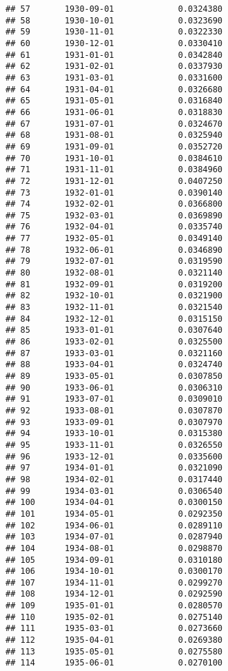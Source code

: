 \documentclass[
]{article}
\begin{document}
\begin{verbatim}
## 57       1930-09-01             0.0324380
## 58       1930-10-01             0.0323690
## 59       1930-11-01             0.0322330
## 60       1930-12-01             0.0330410
## 61       1931-01-01             0.0342840
## 62       1931-02-01             0.0337930
## 63       1931-03-01             0.0331600
## 64       1931-04-01             0.0326680
## 65       1931-05-01             0.0316840
## 66       1931-06-01             0.0318830
## 67       1931-07-01             0.0324670
## 68       1931-08-01             0.0325940
## 69       1931-09-01             0.0352720
## 70       1931-10-01             0.0384610
## 71       1931-11-01             0.0384960
## 72       1931-12-01             0.0407250
## 73       1932-01-01             0.0390140
## 74       1932-02-01             0.0366800
## 75       1932-03-01             0.0369890
## 76       1932-04-01             0.0335740
## 77       1932-05-01             0.0349140
## 78       1932-06-01             0.0346890
## 79       1932-07-01             0.0319590
## 80       1932-08-01             0.0321140
## 81       1932-09-01             0.0319200
## 82       1932-10-01             0.0321900
## 83       1932-11-01             0.0321540
## 84       1932-12-01             0.0315150
## 85       1933-01-01             0.0307640
## 86       1933-02-01             0.0325500
## 87       1933-03-01             0.0321160
## 88       1933-04-01             0.0324740
## 89       1933-05-01             0.0307850
## 90       1933-06-01             0.0306310
## 91       1933-07-01             0.0309010
## 92       1933-08-01             0.0307870
## 93       1933-09-01             0.0307970
## 94       1933-10-01             0.0315380
## 95       1933-11-01             0.0326550
## 96       1933-12-01             0.0335600
## 97       1934-01-01             0.0321090
## 98       1934-02-01             0.0317440
## 99       1934-03-01             0.0306540
## 100      1934-04-01             0.0300150
## 101      1934-05-01             0.0292350
## 102      1934-06-01             0.0289110
## 103      1934-07-01             0.0287940
## 104      1934-08-01             0.0298870
## 105      1934-09-01             0.0310180
## 106      1934-10-01             0.0300170
## 107      1934-11-01             0.0299270
## 108      1934-12-01             0.0292590
## 109      1935-01-01             0.0280570
## 110      1935-02-01             0.0275140
## 111      1935-03-01             0.0273660
## 112      1935-04-01             0.0269380
## 113      1935-05-01             0.0275580
## 114      1935-06-01             0.0270100

\end{verbatim}
\end{document}
